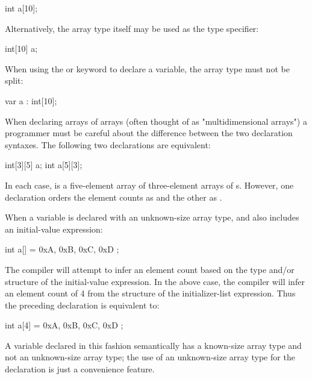 \begin{codeblock}
int a[10];
\end{codeblock}

Alternatively, the array type itself may be used as the type specifier:

\begin{codeblock}
int[10] a;
\end{codeblock}

When using the  or  keyword to declare a variable, the array type must not be split:

\begin{codeblock}
var a : int[10];
\end{codeblock}

\begin{Note}
When declaring arrays of arrays (often thought of as "multidimensional arrays") a programmer must be careful about the difference between the two declaration syntaxes.
The following two declarations are equivalent:
\begin{codeblock}
int[3][5] a;
int a[5][3];
\end{codeblock}
In each case,  is a five-element array of three-element arrays of s.
However, one declaration orders the element counts as \Char{[3][5]} and the other as \Char{[5][3]}.
\end{Note}


When a variable is declared with an unknown-size array type, and also includes an initial-value expression:

\begin{codeblock}
int a[] = { 0xA, 0xB, 0xC, 0xD };
\end{codeblock}

The compiler will attempt to infer an element count based on the type and/or structure of the initial-value expression.
In the above case, the compiler will infer an element count of 4 from the structure of the initializer-list expression.
Thus the preceding declaration is equivalent to:

\begin{codeblock}
int a[4] = { 0xA, 0xB, 0xC, 0xD };
\end{codeblock}

A variable declared in this fashion semantically has a known-size array type and not an unknown-size array type; the use of an unknown-size array type for the declaration is just a convenience feature.

